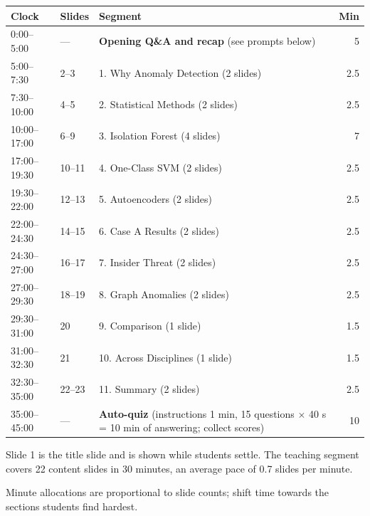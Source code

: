 \documentclass[11pt]{article}
\begin{document}
\begin{center}\small\renewcommand{\arraystretch}{1.2}\begin{tabularx}{\textwidth}{@{}l l X r@{}}\toprule\textbf{Clock} & \textbf{Slides} & \textbf{Segment} & \textbf{Min}\\\midrule

0:00--5:00 & --- & \textbf{Opening Q\&A and recap} (see prompts below) & 5\\

5:00--7:30 & 2--3 & 1. Why Anomaly Detection (2 slides) & 2.5\\

7:30--10:00 & 4--5 & 2. Statistical Methods (2 slides) & 2.5\\

10:00--17:00 & 6--9 & 3. Isolation Forest (4 slides) & 7\\

17:00--19:30 & 10--11 & 4. One-Class SVM (2 slides) & 2.5\\

19:30--22:00 & 12--13 & 5. Autoencoders (2 slides) & 2.5\\

22:00--24:30 & 14--15 & 6. Case A Results (2 slides) & 2.5\\

24:30--27:00 & 16--17 & 7. Insider Threat (2 slides) & 2.5\\

27:00--29:30 & 18--19 & 8. Graph Anomalies (2 slides) & 2.5\\

29:30--31:00 & 20 & 9. Comparison (1 slide) & 1.5\\

31:00--32:30 & 21 & 10. Across Disciplines (1 slide) & 1.5\\

32:30--35:00 & 22--23 & 11. Summary (2 slides) & 2.5\\

35:00--45:00 & --- & \textbf{Auto-quiz} (instructions 1 min, 15 questions $\times$ 40 s = 10 min of answering; collect scores) & 10\\\bottomrule\end{tabularx}\end{center}

Slide 1 is the title slide and is shown while students settle. The teaching segment covers 22 content slides in 30 minutes, an average pace of 0.7 slides per minute. 

Minute allocations are proportional to slide counts; shift time towards the sections students find hardest.
\end{document}

